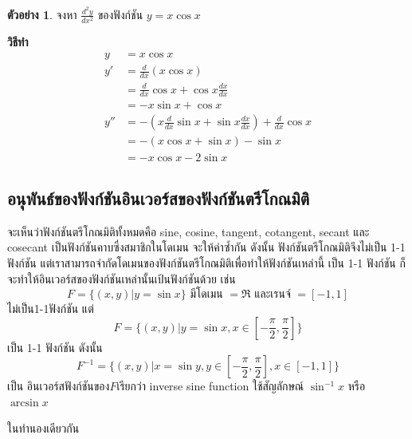 \documentclass[
]{book}
\theoremstyle{definition}
\theoremstyle{definition}
\newtheorem{example}{ตัวอย่าง}[chapter]
\theoremstyle{definition}
\theoremstyle{definition}
\theoremstyle{remark}
\begin{document}
\begin{example}
จงหา \(\displaystyle \frac{d^{2}y}{dx^{2}}\) ของฟังก์ชัน \(y=
x\cos x\)
\end{example}

\textbf{วิธีทำ} \begin{equation}   \begin{aligned}
y&= x\cos x\\
\displaystyle y'&=\frac{d}{dx}(x\cos x)\\
&=\displaystyle \frac{d}{dx}\cos x +\cos x\frac{dx}{dx}\\
&=-x\sin x + \cos x\\
\displaystyle y''&=-(x\frac{d}{dx}\sin x + \sin x\frac{dx}{dx}) +
\frac{d}{dx}\cos x \\
&=-(x\cos x + \sin x)-\sin x\\
&=-x\cos x - 2\sin x
  \end{aligned} \end{equation}

\subsection{อนุพันธ์ของฟังก์ชันอินเวอร์สของฟังก์ชันตรีโกณมิติ}\label{uxe2duxe19uxe1euxe19uxe18uxe02uxe2duxe07uxe1fuxe07uxe01uxe0auxe19uxe2duxe19uxe40uxe27uxe2duxe23uxe2auxe02uxe2duxe07uxe1fuxe07uxe01uxe0auxe19uxe15uxe23uxe42uxe01uxe13uxe21uxe15}

จะเห็นว่าฟังก์ชันตรีโกณมิติทั้งหมดคือ sine, cosine, tangent, cotangent, secant และ
cosecant เป็นฟังก์ชันคาบซึ่งสมาชิกในโดเมน จะให้ค่าซ้ำกัน ดังนั้น ฟังก์ชันตรีโกณมิติจึงไม่เป็น
1-1 ฟังก์ชัน แต่เราสามารถจำกัดโดเมนของฟังก์ชันตรีโกณมิติเพื่อทำให้ฟังก์ชันเหล่านี้ เป็น 1-1
ฟังก์ชัน ก็จะทำให้อินเวอร์สของฟังก์ชันเหล่านั้นเป้นฟังก์ชันด้วย เช่น
\[F=\{(x,y)|y=\sin x\} \text{ มีโดเมน }=\Re \text { และเรนจ์ }=[-1,1]\]
ไม่เป็น1-1ฟังก์ชัน แต่
\[F=\{(x,y)|y=\sin x , x\in \displaystyle [-\frac{\pi}{2},\frac{\pi}{2}]\}\]
เป็น 1-1 ฟังก์ชัน ดังนั้น
\[F^{-1}=\{(x,y)|x=\sin y , y\in \displaystyle [-\frac{\pi}{2},\frac{\pi}{2}],
x\in [-1,1]\}\] เป็น อินเวอร์สฟังก์ชันของ\(F\)เรียกว่า inverse sine function
ใช้สัญลักษณ์ \(\sin^{-1} x\) หรือ \(\arcsin x\)

ในทำนองเดียวกัน
\end{document}
